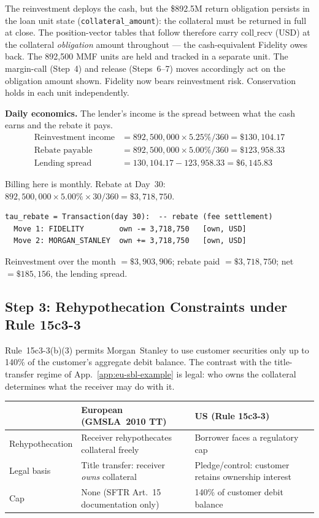 \noindent The reinvestment deploys the cash, but the \$892.5M return obligation persists in the loan unit state (\texttt{collateral\_amount}): the collateral must be returned in full at close. The position-vector tables that follow therefore carry $\mathrm{coll\_recv}$ (USD) at the collateral \emph{obligation} amount throughout --- the cash-equivalent Fidelity owes back. The 892{,}500 MMF units are held and tracked in a separate unit. The margin-call (Step~4) and release (Steps~6--7) moves accordingly act on the obligation amount shown. Fidelity now bears reinvestment risk. Conservation holds in each unit independently.

\medskip
\noindent\textbf{Daily economics.} The lender's income is the spread between what the cash earns and the rebate it pays.
\begin{align*}
\text{Reinvestment income} &= 892{,}500{,}000 \times 5.25\% / 360 = \$130{,}104.17 \\
\text{Rebate payable} &= 892{,}500{,}000 \times 5.00\% / 360 = \$123{,}958.33 \\
\text{Lending spread} &= 130{,}104.17 - 123{,}958.33 = \$6{,}145.83
\end{align*}

\noindent Billing here is monthly. Rebate at Day~30: $892{,}500{,}000 \times 5.00\% \times 30/360 = \$3{,}718{,}750$.

\begin{lstlisting}
tau_rebate = Transaction(day 30):  -- rebate (fee settlement)
  Move 1: FIDELITY        own -= 3,718,750   [own, USD]
  Move 2: MORGAN_STANLEY  own += 3,718,750   [own, USD]
\end{lstlisting}

\noindent Reinvestment over the month $= \$3{,}903{,}906$; rebate paid $= \$3{,}718{,}750$; net $= \$185{,}156$, the lending spread.

\subsection{Step 3: Rehypothecation Constraints under Rule 15c3-3}
\label{sec:us-step3}

Rule~15c3-3(b)(3) permits Morgan~Stanley to use customer securities only up to 140\% of the customer's aggregate debit balance. The contrast with the title-transfer regime of App.~\ref{app:eu-sbl-example} is legal: who owns the collateral determines what the receiver may do with it.

\begin{center}\small
\begin{tabular}{l p{5cm} p{5cm}}
\toprule
& \textbf{European (GMSLA~2010 TT)} & \textbf{US (Rule 15c3-3)} \\
\midrule
Rehypothecation & Receiver rehypothecates collateral freely & Borrower faces a regulatory cap \\
Legal basis & Title transfer: receiver \emph{owns} collateral & Pledge/control: customer retains ownership interest \\
Cap & None (SFTR Art.~15 documentation only) & 140\% of customer debit balance \\
\bottomrule
\end{tabular}
\end{center}

